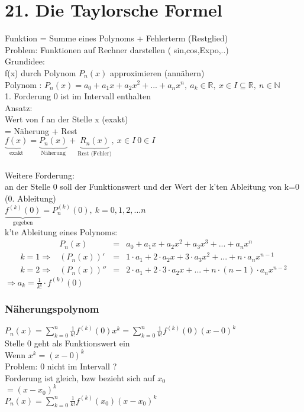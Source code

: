 \documentclass[12pt,a4paper]{article}
\renewenvironment{shaded}{%
	\def\FrameCommand{\fboxsep=\FrameSep \colorbox{shadecolor}}%
	\MakeFramed{\advance\hsize-\width \FrameRestore\FrameRestore}}%
{\endMakeFramed}
\begin{document}
\section{21. Die Taylorsche Formel}
Funktion = Summe eines Polynoms + Fehlerterm (Restglied) \\
Problem: Funktionen auf Rechner darstellen ( sin,cos,Expo,..)\\
Grundidee:\\
f(x) durch Polynom $P_n(x)$ approximieren (annähern)\\
Polynom :\hspace{5mm}
$P_n(x) = a_0 + a_1 x + a_2 x^2 + ... + a_n x^n,\ a_k\in\mathbb{R},\ x\in I \subseteq\mathbb{R},\ n\in\mathbb{N}$\\
1. Forderung 0 ist im Intervall enthalten\\
Ansatz:\\
Wert von f an der Stelle x (exakt)\\
= Näherung + Rest\\
$\underbrace{f(x)}_{\text{exakt}}=\underbrace{P_n(x)}_{\text{Näherung}}+\underbrace{R_n(x)}_{\text{Rest (Fehler)}},\ x\in I\ 0\in I$\\
\\
Weitere Forderung:\\
an der Stelle 0 soll der Funktionswert und der Wert der k'ten Ableitung von k=0 (0. Ableitung)\\
$\underbrace{f^{(k)}(0)}_{\text{gegeben}}=P_n^{(k)}(0),\ k=0,1,2,...n$\\
k'te Ableitung eines Polynoms:\\
$$
\begin{matrix}
& P_n(x)&=&a_0+a_1 x+a_2 x^2+a_3 x^3+...+a_n x^n\\
k=1\Rightarrow & \left(P_n(x)\right)'&=&1\cdot a_1+2\cdot a_2 x+3\cdot a_3 x^2+...+n\cdot a_n x^{n-1}\\
k=2\Rightarrow & \left(P_n(x)\right)''&=&2\cdot a_1+2\cdot 3\cdot a_2 x+...+n\cdot\left(n-1\right)\cdot a_n x^{n-2}
\end{matrix}
$$
\begin{shaded}
	$\Rightarrow a_k=\frac{1}{k!}\cdot f^{(k)}(0)$
\end{shaded}

\subsubsection{Näherungspolynom}
$P_n(x)=\sum\limits_{k=0}^{n}\frac{1}{k!}f^{(k)}(0)x^k= \sum\limits_{k=0}^{n}\frac{1}{k!}f^{(k)}(0)\left(x-0\right)^k$\\
Stelle 0 geht als Funktionswert ein\\
Wenn $x^k = (x-0)^k$\\
Problem: 0 nicht im Intervall ?\\
Forderung ist gleich, bzw bezieht sich auf $x_0$\\
$= (x-x_0)^k$\\
$P_n(x)=\sum\limits_{k=0}^{n}\frac{1}{k!}f^{(k)}\left(x_0\right)\left(x-x_0\right)^k$
\end{document}
